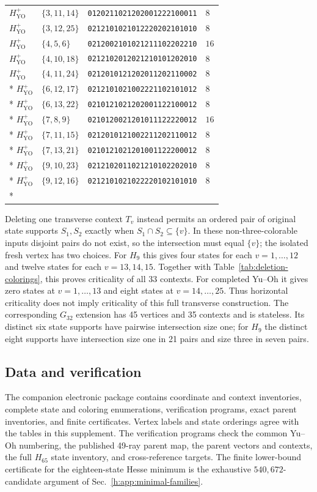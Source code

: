 \documentclass[aps,pra,reprint,superscriptaddress,longbibliography,nofootinbib,floatfix,10pt]{revtex4-2}
\theoremstyle{definition}
\newcommand{\YO}{\mathrm{YO}}
\begin{document}
\begin{longtable}{llll}
$H_{\YO}^+$ & $\{3,11,14\}$ & \texttt{0120211021202001222100011} & $8$\\
$H_{\YO}^+$ & $\{3,12,25\}$ & \texttt{0212101021012220202101010} & $8$\\
$H_{\YO}^+$ & $\{4,5,6\}$ & \texttt{0212002101021211102202210} & $16$\\
$H_{\YO}^+$ & $\{4,10,18\}$ & \texttt{0212102012021210101202010} & $8$\\
$H_{\YO}^+$ & $\{4,11,24\}$ & \texttt{0212010121202011202110002} & $8$\\*
$H_{\YO}^+$ & $\{6,12,17\}$ & \texttt{0212101021002221102101012} & $8$\\*
$H_{\YO}^+$ & $\{6,13,22\}$ & \texttt{0210121021202001122100012} & $8$\\*
$H_{\YO}^+$ & $\{7,8,9\}$ & \texttt{0210120021201011122220012} & $16$\\*
$H_{\YO}^+$ & $\{7,11,15\}$ & \texttt{0212010121002211202110012} & $8$\\*
$H_{\YO}^+$ & $\{7,13,21\}$ & \texttt{0210121021201001122200012} & $8$\\*
$H_{\YO}^+$ & $\{9,10,23\}$ & \texttt{0212102011021210102202010} & $8$\\*
$H_{\YO}^+$ & $\{9,12,16\}$ & \texttt{0212101021022220102101010} & $8$\\*
\end{longtable}
\endgroup
Deleting one transverse context $T_v$ instead permits an ordered
pair of original state supports $S_1,S_2$ exactly when
$S_1\cap S_2\subseteq\{v\}$. In these non-three-colorable inputs
disjoint pairs do not exist, so the intersection must equal $\{v\}$;
the isolated fresh vertex has two choices. For $H_9$ this gives four
states for each $v=1,\ldots,12$ and twelve states for each
$v=13,14,15$. Together with Table~\ref{tab:deletion-colorings}, this
proves criticality of all 33 contexts. For completed Yu--Oh it gives
zero states at $v=1,\ldots,13$ and eight states at
$v=14,\ldots,25$. Thus horizontal criticality does not imply
criticality of this full transverse construction. The corresponding
$G_{32}$ extension has 45 vertices and 35 contexts and is stateless.
Its distinct six state supports have pairwise intersection size one;
for $H_9$ the distinct eight supports have intersection size one in
21 pairs and size three in seven pairs.

\subsection{Data and verification}\label{app:data-verification}
The companion electronic package contains coordinate and context inventories,
complete state and coloring enumerations, verification programs, exact parent
inventories, and finite certificates. Vertex labels and state orderings agree
with the tables in this supplement. The verification programs check the common
Yu--Oh numbering, the published 49-ray parent map, the parent vectors and
contexts, the full $H_{65}$ state inventory, and cross-reference targets.
The finite lower-bound certificate for the eighteen-state Hesse minimum is
the exhaustive $540{,}672$-candidate argument of Sec.~\ref{h:app:minimal-families}.
\end{document}

